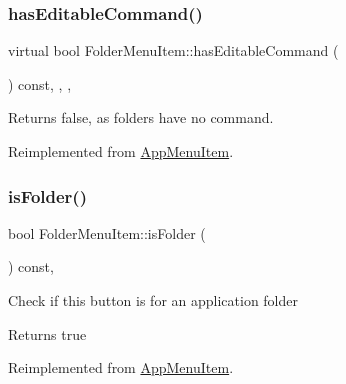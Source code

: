 \mbox{\label{classFolderMenuItem_ad38b52ffa7098be2aa8bef09b4013f0e}} 
\subsubsection{\texorpdfstring{has\+Editable\+Command()}{hasEditableCommand()}}
{\footnotesize\ttfamily virtual bool Folder\+Menu\+Item\+::has\+Editable\+Command (\begin{DoxyParamCaption}{ }\end{DoxyParamCaption}) const\hspace{0.3cm}{\ttfamily [inline]}, {\ttfamily [override]}, {\ttfamily [protected]}, {\ttfamily [virtual]}}

\begin{DoxyReturn}{Returns}
false, as folders have no command. 
\end{DoxyReturn}


Reimplemented from \mbox{\hyperlink{classAppMenuItem_a295fde428e713a8c891dc19b5048c373}{App\+Menu\+Item}}.

\mbox{\label{classFolderMenuItem_a04f57be51d2e79ca6d5e8ed5cdff7815}} 
\subsubsection{\texorpdfstring{is\+Folder()}{isFolder()}}
{\footnotesize\ttfamily bool Folder\+Menu\+Item\+::is\+Folder (\begin{DoxyParamCaption}{ }\end{DoxyParamCaption}) const\hspace{0.3cm}{\ttfamily [override]}, {\ttfamily [virtual]}}

Check if this button is for an application folder \begin{DoxyReturn}{Returns}
true 
\end{DoxyReturn}


Reimplemented from \mbox{\hyperlink{classAppMenuItem_a8246d80e6cec284fa67a69eb8fa12354}{App\+Menu\+Item}}.

\mbox{\label{classFolderMenuItem_a294208ac148dd8af604edea603d9dcf1}} 
